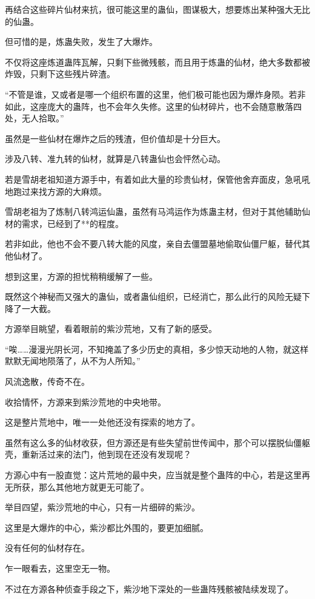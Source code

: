 \begin{this_body}
再结合这些碎片仙材来抗，很可能这里的蛊仙，图谋极大，想要炼出某种强大无比的仙蛊。

但可惜的是，炼蛊失败，发生了大爆炸。

不仅将这座炼道蛊阵瓦解，只剩下些微残骸，而且用于炼蛊的仙材，绝大多数都被炸毁，只剩下这些残片碎渣。

“不管是谁，又或者是哪一个组织布置的这里，他们极可能也因为爆炸身陨。若非如此，这座庞大的蛊阵，也不会年久失修。这里的仙材碎片，也不会随意散落四处，无人拾取。”

虽然是一些仙材在爆炸之后的残渣，但价值却是十分巨大。

涉及八转、准九转的仙材，就算是八转蛊仙也会怦然心动。

若是雪胡老祖知道方源手中，有着如此大量的珍贵仙材，保管他舍弃面皮，急吼吼地跑过来找方源的大麻烦。

雪胡老祖为了炼制八转鸿运仙蛊，虽然有马鸿运作为炼蛊主材，但对于其他辅助仙材的需求，已经到了**的程度。

若非如此，他也不会不要八转大能的风度，亲自去僵盟墓地偷取仙僵尸躯，替代其他仙材了。

想到这里，方源的担忧稍稍缓解了一些。

既然这个神秘而又强大的蛊仙，或者蛊仙组织，已经消亡，那么此行的风险无疑下降了一大截。

方源举目眺望，看着眼前的紫沙荒地，又有了新的感受。

“唉……漫漫光阴长河，不知掩盖了多少历史的真相，多少惊天动地的人物，就这样默默无闻地陨落了，从不为人所知。”

风流逸散，传奇不在。

收拾情怀，方源来到紫沙荒地的中央地带。

这是整片荒地中，唯一一处他还没有探索的地方了。

虽然有这么多的仙材收获，但方源还是有些失望前世传闻中，那个可以摆脱仙僵躯壳，重新活过来的法门，他到现在还没有发现呢？

方源心中有一股直觉：这片荒地的最中央，应当就是整个蛊阵的中心，若是这里再无所获，那么其他地方就更无可能了。

举目四望，紫沙荒地的中心，只有一片细碎的紫沙。

这里是大爆炸的中心，紫沙都比外围的，要更加细腻。

没有任何的仙材存在。

乍一眼看去，这里空无一物。

不过在方源各种侦查手段之下，紫沙地下深处的一些蛊阵残骸被陆续发现了。


\end{this_body}
